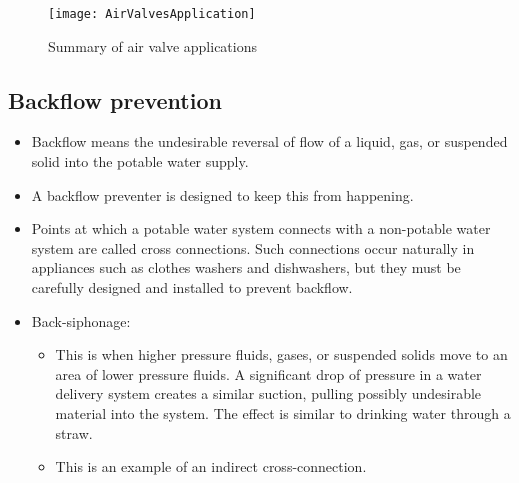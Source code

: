 \thispagestyle{empty}
\begin{landscape}
 \vspace{3cm}
\hspace{1cm}
\begin{figure}
     \texttt{[image: AirValvesApplication]}
     \caption{Summary of air valve applications}
\label{fig:Airvalve1}
     \end{figure}
     \end{landscape}

\subsection{Backflow prevention}
\begin{itemize}[itemsep=0.5em,parsep=-0.5em]
\item Backflow means the undesirable reversal of flow of a liquid, gas, or suspended solid into the potable water supply.
\item A backflow preventer is designed to keep this from happening. 
\item Points at which a potable water system connects with a non-potable water system are called cross connections. Such connections occur naturally in appliances such as clothes washers and dishwashers, but they must be carefully designed and installed to prevent backflow. 
\item Back-siphonage:
\begin{itemize}
\item This is when higher pressure fluids, gases, or suspended solids move to an area of lower pressure fluids. A significant drop of pressure in a water delivery system creates a similar suction, pulling possibly undesirable material into the system. The effect is similar to drinking water through a straw. 
\item This is an example of an indirect cross-connection.
\end{itemize}


\end{itemize}
